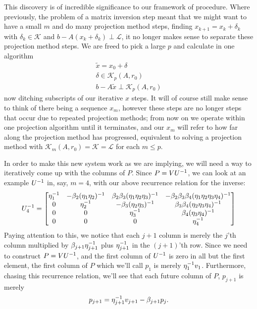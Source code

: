 \documentclass[11pt]{article}
\begin{document}
This discovery is of incredible significance to our framework of procedure. Where previously, the problem of a matrix inversion step meant that we might want to have a small $m$ and do many projection method steps, finding $x_{k+1} = x_k + \delta_k$ with $\delta_k \in \mathcal K$ and $b - A(x_k + \delta_k) \perp \mathcal L$, it no longer makes sense to separate these projection method steps. We are freed to pick a large $p$ and calculate in one algorithm \begin{gather*}
\tilde x = x_0 + \delta\\
\delta \in \mathcal K_p (A, r_0) \\
b - A \tilde x \perp \mathcal K_p (A,r_0)
\end{gather*}
now ditching subscripts of our iterative $x$ steps. It will of course still make sense to think of there being a sequence $x_m$, however these steps are no longer steps that occur due to repeated projection methods; from now on we operate within one projection algorithm until it terminates, and our $x_m$ will refer to how far along the projection method has progressed, equivalent to solving a projection method with $\mathcal K_{m}(A,r_0) = \mathcal K = \mathcal L$ for each $m \le p$.

In order to make this new system work as we are implying, we will need a way to iteratively come up with the columns of $P$. Since $P = V U^{-1}$, we can look at an example $U^{-1}$ in, say, $m=4$, with our above recurrence relation for the inverse: \begin{gather*}
U^{-1}_4 = \begin{bmatrix} \eta_1^{-1} & - \beta_2 (\eta_1 \eta_2)^{-1} & \beta_2 \beta_3 (\eta_1 \eta_2 \eta_3)^{-1} & - \beta_2 \beta_3 \beta_4 (\eta_1 \eta_2 \eta_3 \eta_4)^{-1} \\
0 & \eta_2^{-1} & -\beta_3 (\eta_2 \eta_3)^{-1} & \beta_3 \beta_4 (\eta_2 \eta_3 \eta_4)^{-1} \\
0 & 0 & \eta_3^{-1}  & \beta_4 (\eta_3 \eta_4)^{-1} \\
0 & 0 & 0 & \eta_4^{-1} \end{bmatrix}
\end{gather*}
Paying attention to this, we notice that each $j+1$ column is merely the $j$'th column multiplied by $\beta_{j+1}\eta_{j+1}^{-1}$ plus $\eta_{j+1}^{-1}$ in the $(j+1)$'th row. Since we need to construct $P = V U^{-1}$, and the first column of $U^{-1}$ is zero in all but the first element, the first column of $P$ which we'll call $p_1$ is merely $\eta_1^{-1} v_1$. Furthermore, chasing this recurrence relation, we'll see that each future column of $P$, $p_{j+1}$ is merely \begin{gather*}
p_{j+1} = \eta_{j+1}^{-1} v_{j+1} - \beta_{j+1} p_j.
\end{gather*}
\end{document}
